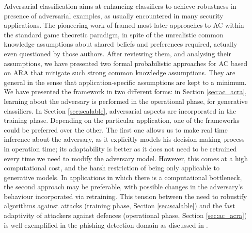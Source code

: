 Adversarial classification aims at enhancing classifiers to achieve robustness in presence of adversarial examples, as usually encountered in many security applications. The pioneering work of \parencite{dalvi2004adversarial} framed most later approaches to AC 
within the standard game theoretic paradigm, in spite of the unrealistic common knowledge assumptions about shared beliefs and preferences required, actually even questioned by those authors. After reviewing them, and analysing  their assumptions, we have presented two formal probabilistic approaches for AC based on ARA that mitigate 
such strong common knowledge assumptions.
They are general in the sense that application-specific assumptions are kept to a minimum. 
%
We have presented the framework in two different forms: in Section \ref{sec:ac_acra}, learning about the adversary is performed in the
operational phase, for generative classifiers. In Section \ref{sec:scalable}, adversarial aspects are incorporated in the training phase. Depending on the particular application, one of the frameworks could be preferred over the other. The first one allows us to make real time inference about the adversary, as it explicitly models his decision making process in operation time; its adaptability is better as it does not need to be retrained every time we need to modify the adversary model. However, this comes at a high computational cost, and the harsh restriction of being only applicable to generative models. In applications in which there is a computational bottleneck, the second approach may be preferable, with possible changes in the adversary's behaviour incorporated via retraining.
This tension between the need to robustify algorithms against attacks (training phase, Section  \ref{sec:scalable}) and the fast adaptivity of attackers against defences (operational phase, Section \ref{sec:ac_acra}) is well exemplified in the phishing detection domain as discussed in \parencite{rakesh}.








